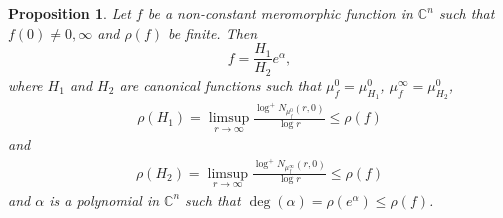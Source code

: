 \documentclass[11pt,reqno]{amsart}
\newtheorem{propo}{Proposition}[section]
\numberwithin{equation}{section}
\begin{document}
\begin{propo}\label{Pro1} Let $f$ be a non-constant meromorphic function in $\mathbb{C}^n$ such that $f(0)\neq 0,\infty$ and $\rho(f)$ be finite. Then $$
f=\frac{H_1}{H_2}e^{\alpha},$$
where $H_1$ and $H_2$ are canonical functions such that $\mu^0_f=\mu^0_{H_1}$, $\mu^{\infty}_f=\mu^0_{H_2}$,
\begin{align*}
\rho(H_1)=\limsup\limits_{r\to\infty} \frac{\log^+ N_{\mu^0_{f}}(r,0)}{\log r}\leq \rho(f)
\end{align*}
and 
\begin{align*}
\rho(H_2)=\limsup\limits_{r\to\infty} \frac{\log^+ N_{\mu^{\infty}_{f}}(r,0)}{\log r}\leq \rho(f)
\end{align*}
and $\alpha$ is a polynomial in $\mathbb{C}^n$ such that $\deg(\alpha)=\rho(e^{\alpha})\leq \rho(f)$.
\end{propo}
\end{document}
